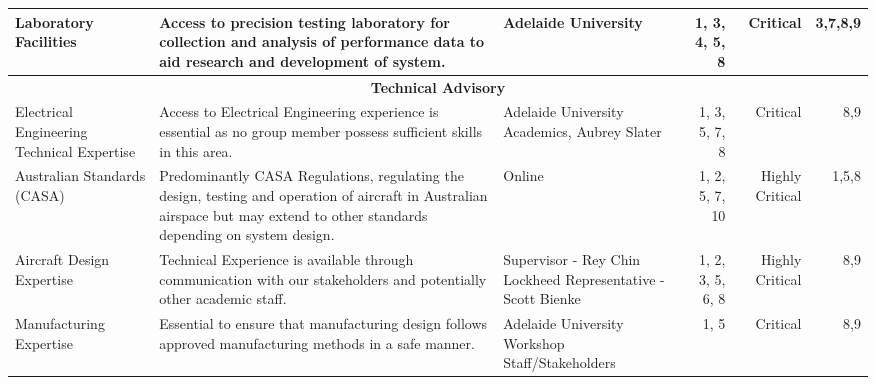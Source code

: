 \begin{table}[]
{\begin{tabular}{|p{4cm}|p{12cm}|p{8cm}|r|r|r|}
Laboratory Facilities                      & Access to precision testing laboratory for collection and analysis of performance data to aid research and development of system.                                               & Adelaide University                                                                                          & 1, 3, 4, 5, 8                                  & Critical                                  & 3,7,8,9                                    \\ \hline
\multicolumn{6}{|c|}{\textbf{Technical Advisory}}                                                                                                                                                                                                                                                                                                                                                                                                                                   \\ \hline
Electrical Engineering Technical Expertise & Access to Electrical Engineering experience is essential as no group member possess sufficient skills in this area.                                                              & Adelaide University Academics, Aubrey Slater                                                                 & 1, 3, 5, 7, 8                                  & Critical                                  & 8,9                                        \\ \hline
Australian Standards (CASA)                & Predominantly CASA Regulations, regulating the design, testing and operation of aircraft in Australian airspace but may extend to other standards depending on system design. & Online                                                                                          & 1, 2, 5, 7, 10                                     & Highly Critical                           & 1,5,8                                      \\ \hline
Aircraft Design Expertise                  & Technical Experience is available through communication with our stakeholders and potentially other academic staff.                                                            & Supervisor - Rey Chin Lockheed Representative - Scott Bienke                                                 & 1, 2, 3, 5, 6, 8                               & Highly Critical                           & 8,9                                        \\ \hline
Manufacturing Expertise          & Essential to ensure that manufacturing design follows approved manufacturing methods in a safe manner.                                                                            & Adelaide University Workshop Staff/Stakeholders                                                                                          & 1, 5                                        & Critical                                  & 8,9                                        \\ \hline

\end{tabular}}
\end{table}
